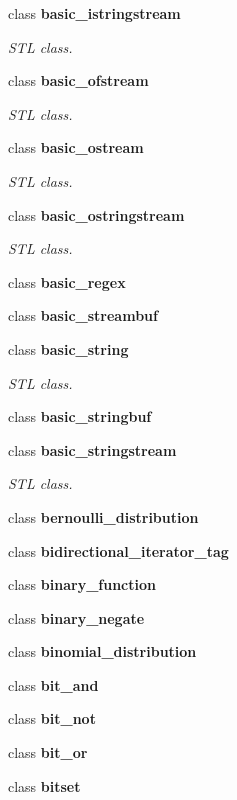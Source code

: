 \begin{DoxyCompactItemize}
class \textbf{ basic\+\_\+istringstream}
\begin{DoxyCompactList}\small\item\em S\+TL class. \end{DoxyCompactList}\item 
class \textbf{ basic\+\_\+ofstream}
\begin{DoxyCompactList}\small\item\em S\+TL class. \end{DoxyCompactList}\item 
class \textbf{ basic\+\_\+ostream}
\begin{DoxyCompactList}\small\item\em S\+TL class. \end{DoxyCompactList}\item 
class \textbf{ basic\+\_\+ostringstream}
\begin{DoxyCompactList}\small\item\em S\+TL class. \end{DoxyCompactList}\item 
class \textbf{ basic\+\_\+regex}
\item 
class \textbf{ basic\+\_\+streambuf}
\item 
class \textbf{ basic\+\_\+string}
\begin{DoxyCompactList}\small\item\em S\+TL class. \end{DoxyCompactList}\item 
class \textbf{ basic\+\_\+stringbuf}
\item 
class \textbf{ basic\+\_\+stringstream}
\begin{DoxyCompactList}\small\item\em S\+TL class. \end{DoxyCompactList}\item 
class \textbf{ bernoulli\+\_\+distribution}
\item 
class \textbf{ bidirectional\+\_\+iterator\+\_\+tag}
\item 
class \textbf{ binary\+\_\+function}
\item 
class \textbf{ binary\+\_\+negate}
\item 
class \textbf{ binomial\+\_\+distribution}
\item 
class \textbf{ bit\+\_\+and}
\item 
class \textbf{ bit\+\_\+not}
\item 
class \textbf{ bit\+\_\+or}
\item 
class \textbf{ bitset}

\end{DoxyCompactItemize}
